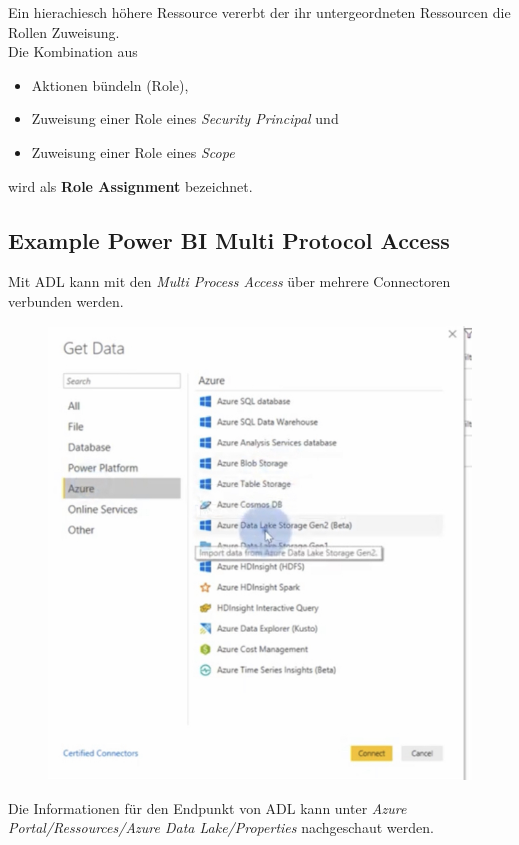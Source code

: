 Ein hierachiesch höhere Ressource vererbt der ihr untergeordneten Ressourcen die Rollen Zuweisung.\\

Die Kombination aus 
\begin{itemize}
	\item Aktionen bündeln (Role),
	\item Zuweisung einer Role eines \textit{Security Principal} und
	\item Zuweisung einer Role eines \textit{Scope}
\end{itemize}
wird als \textbf{Role Assignment} bezeichnet.

\subsection{Example Power BI Multi Protocol Access}
Mit \gls{ADL} kann mit den \textit{Multi Process Access} über mehrere Connectoren verbunden werden.

\begin{figure}[H]
	\centering
	\includegraphics[scale = 0.2]{attachment/chapter_2/Scc125}
\end{figure}

Die Informationen für den Endpunkt von \gls{ADL} kann unter \textit{Azure Portal/Ressources/Azure Data Lake/Properties} nachgeschaut werden.

